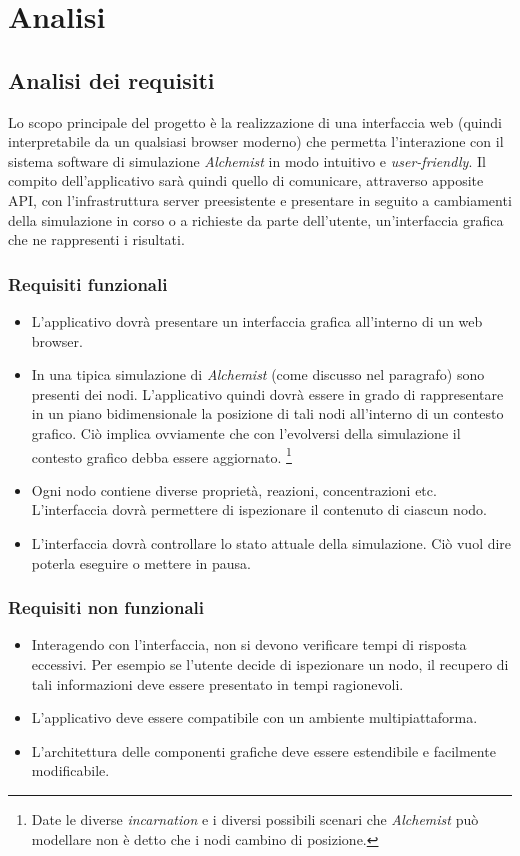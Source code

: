 \chapter{Analisi}

\section{Analisi dei requisiti}
Lo scopo principale del progetto è la realizzazione di una interfaccia web (quindi interpretabile da un qualsiasi browser moderno) che permetta l'interazione con il sistema software di simulazione
\textit{Alchemist} in modo intuitivo e \textit{user-friendly}. Il compito dell'applicativo sarà quindi quello di comunicare, attraverso apposite \ac{API}, con l'infrastruttura server preesistente e presentare in seguito a cambiamenti della simulazione in corso o a richieste da parte dell'utente, un'interfaccia grafica che ne rappresenti i risultati.
\subsection{Requisiti funzionali}
\begin{itemize}
	\item L'applicativo dovrà presentare un interfaccia grafica all'interno di un web browser.
	\item In una tipica simulazione di \textit{Alchemist} (come discusso nel paragrafo) sono presenti dei nodi. L'applicativo quindi dovrà essere in grado di rappresentare in un piano bidimensionale la posizione di tali nodi all'interno di un contesto grafico. Ciò implica ovviamente che con l'evolversi della simulazione il contesto grafico debba essere aggiornato. \footnote{Date le diverse \textit{incarnation} e i diversi possibili scenari che \textit{Alchemist} può modellare non è detto che i nodi cambino di posizione.}
	\item Ogni nodo contiene diverse proprietà, reazioni, concentrazioni etc. L'interfaccia dovrà permettere di ispezionare il contenuto di ciascun nodo. 
	\item L'interfaccia dovrà controllare lo stato attuale della simulazione. Ciò vuol dire poterla eseguire o mettere in pausa.
\end{itemize}

\subsection{Requisiti non funzionali}
\begin{itemize}
	\item Interagendo con l'interfaccia, non si devono verificare tempi di risposta eccessivi. Per esempio se l'utente decide di ispezionare un nodo, il recupero di tali informazioni deve essere presentato in tempi ragionevoli.
	\item L'applicativo deve essere compatibile con un ambiente multipiattaforma.
	\item L'architettura delle componenti grafiche deve essere estendibile e facilmente modificabile.
\end{itemize}

